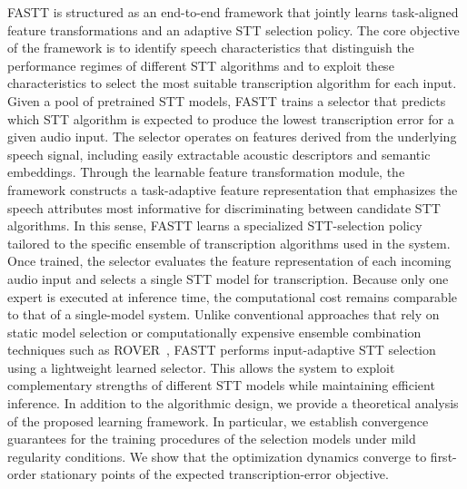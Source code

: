 \documentclass[journal]{IEEEtran}
\begin{document}
FASTT is structured as an end-to-end framework that jointly learns task-aligned feature transformations and an adaptive STT selection policy. The core objective of the framework is to identify speech
characteristics that distinguish the performance regimes of different
STT algorithms and to exploit these characteristics to
select the most suitable transcription algorithm for each input. Given a pool of pretrained STT models, FASTT trains a selector that
predicts which STT algorithm is expected to produce the lowest
transcription error for a given audio input. The selector operates on
features derived from the underlying speech signal, including easily
extractable acoustic descriptors and semantic embeddings. Through the
learnable feature transformation module, the framework constructs a
task-adaptive feature representation that emphasizes the speech
attributes most informative for discriminating between candidate STT
algorithms. In this sense, FASTT learns a specialized STT-selection policy
tailored to the specific ensemble of transcription algorithms used in
the system. Once
trained, the selector evaluates the feature representation of each
incoming audio input and selects a single STT model for transcription.
Because only one expert is executed at inference time, the computational
cost remains comparable to that of a single-model system. Unlike conventional approaches that rely on static model selection or
computationally expensive ensemble combination techniques such as
ROVER~\cite{fiscus1997rover}, FASTT performs input-adaptive STT
selection using a lightweight learned selector. This allows the system
to exploit complementary strengths of different STT models while
maintaining efficient inference. In addition to the algorithmic design, we provide a theoretical analysis of the proposed learning framework. In particular, we establish convergence guarantees for the training procedures of the selection models under mild regularity conditions. We show that the optimization dynamics converge to first-order stationary points of the expected transcription-error objective. 
\end{document}

